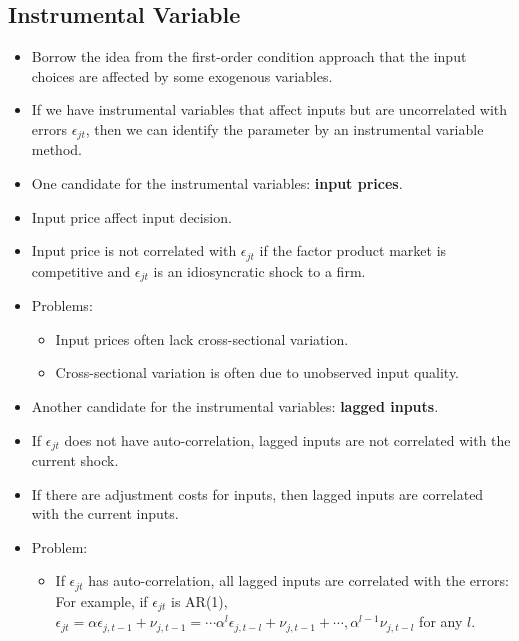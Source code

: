 \documentclass[]{book}
\providecommand{\tightlist}{%
  \setlength{\itemsep}{0pt}\setlength{\parskip}{0pt}}
\begin{document}
\subsection{Instrumental Variable}\label{productioniv}

\begin{itemize}
\item
  Borrow the idea from the first-order condition approach that the input
  choices are affected by some exogenous variables.
\item
  If we have instrumental variables that affect inputs but are
  uncorrelated with errors \(\epsilon_{jt}\), then we can identify the
  parameter by an instrumental variable method.
\item
  One candidate for the instrumental variables: \textbf{input prices}.
\item
  Input price affect input decision.
\item
  Input price is not correlated with \(\epsilon_{jt}\) if the factor
  product market is competitive and \(\epsilon_{jt}\) is an
  idiosyncratic shock to a firm.
\item
  Problems:

  \begin{itemize}
  \tightlist
  \item
    Input prices often lack cross-sectional variation.
  \item
    Cross-sectional variation is often due to unobserved input quality.
  \end{itemize}
\item
  Another candidate for the instrumental variables: \textbf{lagged
  inputs}.
\item
  If \(\epsilon_{jt}\) does not have auto-correlation, lagged inputs are
  not correlated with the current shock.
\item
  If there are adjustment costs for inputs, then lagged inputs are
  correlated with the current inputs.
\item
  Problem:

  \begin{itemize}
  \tightlist
  \item
    If \(\epsilon_{jt}\) has auto-correlation, all lagged inputs are
    correlated with the errors: For example, if \(\epsilon_{jt}\) is
    AR(1),
    \(\epsilon_{jt} = \alpha \epsilon_{j, t - 1} + \nu_{j, t - 1} = \cdots \alpha^l \epsilon_{j, t - l} + \nu_{j, t - 1} + \cdots, \alpha^{l - 1} \nu_{j, t - l}\)
    for any \(l\).
  \end{itemize}
\end{itemize}
\end{document}
